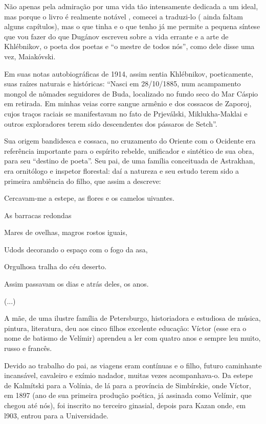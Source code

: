Não apenas pela admiração por uma vida tão intensamente dedicada a um
ideal, mas porque o livro é realmente notável , comecei a traduzi-lo (
ainda faltam alguns capítulos), mas o que tinha e o que tenho já me
permite a pequena síntese que vou fazer do que Dugánov escreveu sobre a
vida errante e a arte de Khlébnikov, o poeta dos poetas e ``o mestre de
todos nós'', como dele disse uma vez, Maiakóvski.

Em suas notas autobiográficas de 1914, assim sentia Khlébnikov,
poeticamente, suas raízes naturais e históricas: ``Nasci em 28/10/1885,
num acampamento mongol de nômades seguidores de Buda, localizado no
fundo seco do Mar Cáspio em retirada. Em minhas veias corre sangue
armênio e dos cossacos de Zaporoj, cujos traços raciais se manifestavam
no fato de Prjeválski, Miklukha-Maklai e outros exploradores terem sido
descendentes dos pássaros de Setch''.

Sua origem bandidesca e cossaca, no cruzamento do Oriente com o Ocidente
era referência importante para o espírito rebelde, unificador e
sintético de sua obra, para seu ``destino de poeta''. Seu pai, de uma
família conceituada de Astrakhan, era ornitólogo e inspetor florestal:
daí a natureza e seu estudo terem sido a primeira ambiência do filho,
que assim a descreve:

Cercavam-me a estepe, as flores e os camelos uivantes.

As barracas redondas

Mares de ovelhas, magros rostos iguais,

Udods decorando o espaço com o fogo da asa,

Orgulhosa tralha do céu deserto.

Assim passavam os dias e atrás deles, os anos.

(...)

A mãe, de uma ilustre família de Petersburgo, historiadora e estudiosa
de música, pintura, literatura, deu aos cinco filhos excelente educação:
Víctor (esse era o nome de batismo de Velímir) aprendeu a ler com quatro
anos e sempre leu muito, russo e francês.

Devido ao trabalho do pai, as viagens eram contínuas e o filho, futuro
caminhante incansável, cavaleiro e exímio nadador, muitas vezes
acompanhava-o. Da estepe de Kalmítski para a Volínia, de lá para a
província de Simbírskie, onde Víctor, em 1897 (ano de sua primeira
produção poética, já assinada como Velímir, que chegou até nós), foi
inscrito no terceiro ginasial, depois para Kazan onde, em l903, entrou
para a Universidade.

